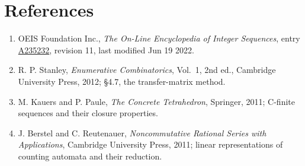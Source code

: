 \documentclass[11pt]{article}
\theoremstyle{definition}
\begin{document}
\section{References}

\begin{enumerate}

\item OEIS Foundation Inc., \emph{The On-Line Encyclopedia of Integer Sequences}, entry \href{https://oeis.org/A235232}{A235232}, revision 11, last modified Jun 19 2022.

\item R. P. Stanley, \emph{Enumerative Combinatorics}, Vol.~1, 2nd ed., Cambridge University Press, 2012; \S4.7, the transfer-matrix method.

\item M. Kauers and P. Paule, \emph{The Concrete Tetrahedron}, Springer, 2011; C-finite sequences and their closure properties.

\item J. Berstel and C. Reutenauer, \emph{Noncommutative Rational Series with Applications}, Cambridge University Press, 2011; linear representations of counting automata and their reduction.

\end{enumerate}
\end{document}
